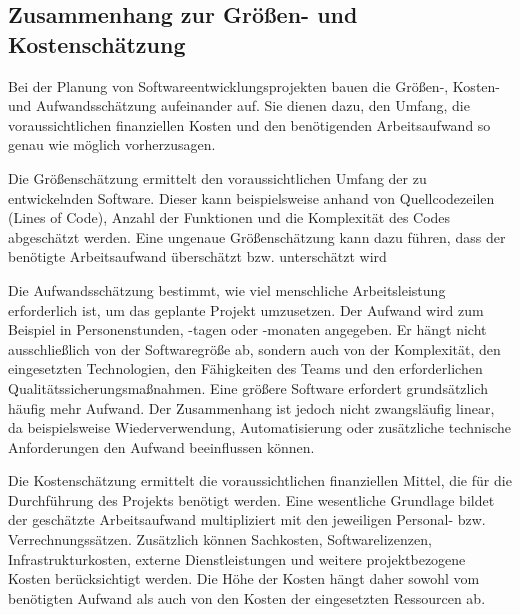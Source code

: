 \documentclass[a4paper,10pt]{article}
\begin{document}
        \subsection*{Zusammenhang zur Grö\ss{}en- und Kostenschätzung}
        Bei der Planung von Softwareentwicklungsprojekten bauen die Grö\ss{}en-, Kosten- und Aufwandsschätzung aufeinander auf.
    Sie dienen dazu, den Umfang, die voraussichtlichen finanziellen Kosten und den benötigenden Arbeitsaufwand so genau wie möglich vorherzusagen.
\par
        Die Grö\ss{}enschätzung ermittelt den voraussichtlichen Umfang der zu entwickelnden Software.
    Dieser kann beispielsweise anhand von Quellcodezeilen (Lines of Code), Anzahl der Funktionen und die Komplexität des Codes abgeschätzt werden.
    Eine ungenaue Grö\ss{}enschätzung kann dazu führen, dass der benötigte Arbeitsaufwand überschätzt bzw. unterschätzt wird
\par
        Die Aufwandsschätzung bestimmt, wie viel menschliche Arbeitsleistung erforderlich ist, um das geplante Projekt umzusetzen. Der Aufwand wird zum Beispiel in Personenstunden, -tagen oder -monaten angegeben.
        Er hängt nicht ausschlie\ss{}lich von der Softwaregrö\ss{}e ab, sondern auch von der Komplexität, den eingesetzten Technologien, den Fähigkeiten des Teams und den erforderlichen Qualitätssicherungsma\ss{}nahmen.
    Eine grö\ss{}ere Software erfordert grundsätzlich häufig mehr Aufwand. Der Zusammenhang ist jedoch nicht zwangsläufig linear, da beispielsweise Wiederverwendung, Automatisierung oder zusätzliche technische Anforderungen den Aufwand beeinflussen können.
\par
        \par\noindent\begin{minipage}{\linewidth}
Die Kostenschätzung ermittelt die voraussichtlichen finanziellen Mittel, die für die Durchführung des Projekts benötigt werden.
        Eine wesentliche Grundlage bildet der geschätzte Arbeitsaufwand multipliziert mit den jeweiligen Personal- bzw. Verrechnungssätzen.
        Zusätzlich können Sachkosten, Softwarelizenzen, Infrastrukturkosten, externe Dienstleistungen und weitere projektbezogene Kosten berücksichtigt werden.
        Die Höhe der Kosten hängt daher sowohl vom benötigten Aufwand als auch von den Kosten der eingesetzten Ressourcen ab.
\end{minipage}\par
\end{document}
